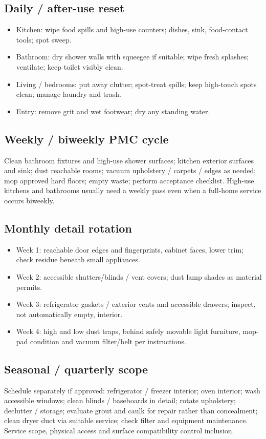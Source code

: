 \documentclass[10pt,letterpaper,oneside]{article}
\begin{document}
\subsection{Daily / after-use reset}
\begin{itemize}
\item Kitchen: wipe food spills and high-use counters; dishes, sink, food-contact tools; spot sweep.
\item Bathroom: dry shower walls with squeegee if suitable; wipe fresh splashes; ventilate; keep toilet visibly clean.
\item Living / bedrooms: put away clutter; spot-treat spills; keep high-touch spots clean; manage laundry and trash.
\item Entry: remove grit and wet footwear; dry any standing water.
\end{itemize}
\subsection{Weekly / biweekly PMC cycle}
Clean bathroom fixtures and high-use shower surfaces; kitchen exterior surfaces and sink; dust reachable rooms; vacuum upholstery / carpets / edges as needed; mop approved hard floors; empty waste; perform acceptance checklist. High-use kitchens and bathrooms usually need a weekly pass even when a full-home service occurs biweekly.
\subsection{Monthly detail rotation}
\begin{itemize}
\item Week 1: reachable door edges and fingerprints, cabinet faces, lower trim; check residue beneath small appliances.
\item Week 2: accessible shutters/blinds / vent covers; dust lamp shades as material permits.
\item Week 3: refrigerator gaskets / exterior vents and accessible drawers; inspect, not automatically empty, interior.
\item Week 4: high and low dust traps, behind safely movable light furniture, mop-pad condition and vacuum filter/belt per instructions.
\end{itemize}
\subsection{Seasonal / quarterly scope}
Schedule separately if approved: refrigerator / freezer interior; oven interior; wash accessible windows; clean blinds / baseboards in detail; rotate upholstery; declutter / storage; evaluate grout and caulk for repair rather than concealment; clean dryer duct via suitable service; check filter and equipment maintenance. Service scope, physical access and surface compatibility control inclusion.
\end{document}
